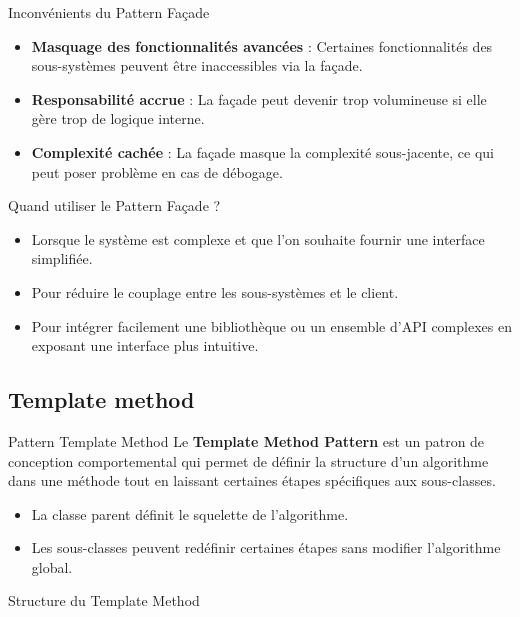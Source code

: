 \documentclass[aspectratio=169]{beamer}
\begin{document}
  \begin{frame}{Inconvénients du Pattern Façade}
    \begin{itemize}
        \item \textbf{Masquage des fonctionnalités avancées} : Certaines fonctionnalités des sous-systèmes peuvent être inaccessibles via la façade.
        \item \textbf{Responsabilité accrue} : La façade peut devenir trop volumineuse si elle gère trop de logique interne.
        \item \textbf{Complexité cachée} : La façade masque la complexité sous-jacente, ce qui peut poser problème en cas de débogage.
    \end{itemize}
  \end{frame}

  \begin{frame}{Quand utiliser le Pattern Façade ?}
    \begin{itemize}
        \item Lorsque le système est complexe et que l'on souhaite fournir une interface simplifiée.
        \item Pour réduire le couplage entre les sous-systèmes et le client.
        \item Pour intégrer facilement une bibliothèque ou un ensemble d'API complexes en exposant une interface plus intuitive.
    \end{itemize}
  \end{frame}

  \subsection{Template method}
  \begin{frame}{Pattern Template Method}
    Le \textbf{Template Method Pattern} est un patron de conception comportemental qui permet de définir la structure d'un algorithme dans une méthode 
    tout en laissant certaines étapes spécifiques aux sous-classes.
    
    \begin{itemize}
        \item La classe parent définit le squelette de l'algorithme.
        \item Les sous-classes peuvent redéfinir certaines étapes sans modifier l'algorithme global.
    \end{itemize}
  \end{frame}


  \begin{frame}{Structure du Template Method}
  \end{frame}
\end{document}
